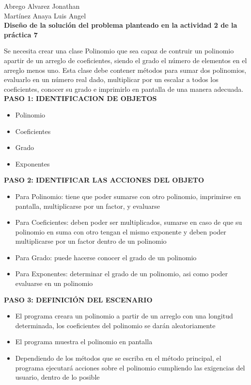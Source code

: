 \documentclass[11pt,a4paper]{report}
\author{Martínez Anaya Luis Angel}
\begin{document}
\begin{center}
  Abrego Alvarez Jonathan \\
  Martínez Anaya Luis Angel \\
  \textbf{Diseño de la solución del problema planteado en la actividad 2 de la práctica 7}
\end{center}

Se necesita crear una clase Polinomio que sea capaz de contruir un polinomio apartir de un arreglo de coeficientes, siendo el grado el número de elementos en el arreglo menos uno. Esta clase debe contener métodos para sumar dos polinomios, evaluarlo en un número real dado, multiplicar por un escalar a todos los coeficientes, conocer su grado e imprimirlo en pantalla de una manera adecuada.  \\

\textbf{PASO 1: IDENTIFICACION DE OBJETOS} \\

\begin{itemize}
  
\item Polinomio
\item Coeficientes
\item Grado
\item Exponentes
  
\end{itemize}

\textbf{PASO 2: IDENTIFICAR LAS ACCIONES DEL OBJETO}

\begin{itemize}

\item Para Polinomio: tiene que poder sumarse con otro polinomio, imprimirse en pantalla, multiplicarse por un factor, y evaluarse
\item Para Coeficientes: deben poder ser multiplicados, sumarse en caso de que su polinomio en suma con otro tengan el mismo exponente y deben poder multiplicarse por un factor dentro de un polinomio
\item Para Grado: puede hacerse conocer el grado de un polinomio
\item Para Exponentes: determinar el grado de un polinomio, asi como poder evaluarse en un polinomio
  
\end{itemize}

\textbf{PASO 3: DEFINICIÓN DEL ESCENARIO}

\begin{itemize}
  
\item El programa creara un polinomio a partir de un arreglo con una longitud determinada, los coeficientes del polinomio se darán aleatoriamente
\item El programa muestra el polinomio en pantalla
\item Dependiendo de los métodos que se escriba en el método principal, el programa ejecutará acciones sobre el polinomio cumpliendo las exigencias del usuario, dentro de lo posible
  
\end{itemize}
\end{document}
